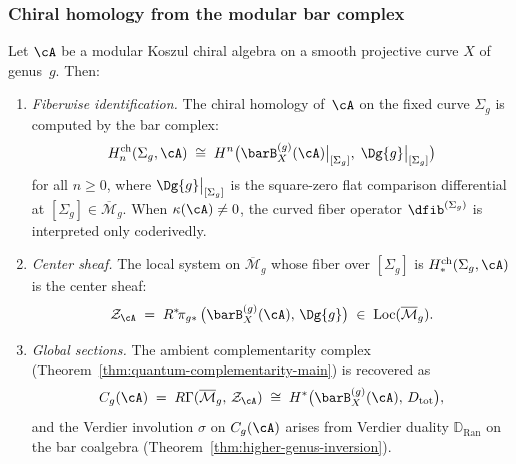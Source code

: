 \subsubsection{Chiral homology from the modular bar complex}
\label{subsubsec:chiral-homology-recovery}

\begin{theorem}\label{thm:chiral-homology-recovery}
Let $\cA$ be a modular Koszul chiral algebra on a smooth projective
curve $X$ of genus~$g$. Then:
\begin{enumerate}[label=\textup{(\roman*)}]
\item \emph{Fiberwise identification.}
 The chiral homology of~$\cA$ on the fixed curve $\Sigma_g$ is
 computed by the bar complex:
 \begin{equation}\label{eq:chiral-homology-bar}
 H^{\mathrm{ch}}_n(\Sigma_g, \cA)
 \;\cong\;
 H^n\bigl(\barB^{(g)}_X(\cA)\big|_{[\Sigma_g]},\;
 \Dg{g}\big|_{[\Sigma_g]}\bigr)
 \end{equation}
 for all $n \geq 0$, where $\Dg{g}\big|_{[\Sigma_g]}$ is the
 square-zero flat comparison differential at
 $[\Sigma_g] \in \overline{\mathcal{M}}_g$. When
 $\kappa(\cA) \neq 0$, the curved fiber operator $\dfib^{(\Sigma_g)}$
 is interpreted only coderivedly.

\item \emph{Center sheaf.}
 The local system on $\overline{\mathcal{M}}_g$ whose fiber
 over $[\Sigma_g]$ is $H^{\mathrm{ch}}_*(\Sigma_g, \cA)$ is the
 center sheaf:
 \begin{equation}\label{eq:center-sheaf-bar}
 \mathcal{Z}_\cA
 \;=\;
 R^*\!\pi_{g*}\,
 \bigl(\barB^{(g)}_X(\cA),\, \Dg{g}\bigr)
 \;\in\;
 \operatorname{Loc}(\overline{\mathcal{M}}_g).
 \end{equation}

\item \emph{Global sections.}
 The ambient complementarity complex
 \textup{(}Theorem~\textup{\ref{thm:quantum-complementarity-main})}
 is recovered as
 \begin{equation}\label{eq:ambient-from-bar}
 C_g(\cA) \;=\; R\Gamma(\overline{\mathcal{M}}_g,\,
 \mathcal{Z}_\cA)
 \;\cong\;
 H^*\bigl(\barB^{(g)}_X(\cA),\, D_{\mathrm{tot}}\bigr),
 \end{equation}
 and the Verdier involution $\sigma$ on $C_g(\cA)$ arises from
 Verdier duality $\mathbb{D}_{\operatorname{Ran}}$ on the bar
 coalgebra
 \textup{(}Theorem~\textup{\ref{thm:higher-genus-inversion})}.


\end{enumerate}
\end{theorem}
